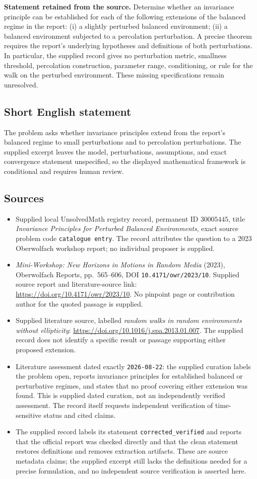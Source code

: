 \documentclass[11pt]{article}
\begin{document}
\textbf{Statement retained from the source.} Determine whether an invariance principle can be established for each of the following extensions of the balanced regime in the report: (i) a slightly perturbed balanced environment; (ii) a balanced environment subjected to a percolation perturbation. A precise theorem requires the report's underlying hypotheses and definitions of both perturbations. In particular, the supplied record gives no perturbation metric, smallness threshold, percolation construction, parameter range, conditioning, or rule for the walk on the perturbed environment. These missing specifications remain unresolved.
\subsection{Short English statement}
The problem asks whether invariance principles extend from the report's balanced regime to small perturbations and to percolation perturbations. The supplied excerpt leaves the model, perturbations, assumptions, and exact convergence statement unspecified, so the displayed mathematical framework is conditional and requires human review.
\subsection{Sources}
\begin{itemize}
\item Supplied local UnsolvedMath registry record, permanent ID \(30005445\), title \emph{Invariance Principles for Perturbed Balanced Environments}, exact source problem code \texttt{catalogue entry}. The record attributes the question to a 2023 Oberwolfach workshop report; no individual proposer is supplied.
\item \emph{Mini-Workshop: New Horizons in Motions in Random Media} (2023), Oberwolfach Reports, pp.\ 565--606, DOI \texttt{10.4171/owr/2023/10}. Supplied source report and literature-source link: \url{https://doi.org/10.4171/owr/2023/10}. No pinpoint page or contribution author for the quoted passage is supplied.
\item Supplied literature source, labelled \emph{random walks in random environments without ellipticity}: \url{https://doi.org/10.1016/j.spa.2013.01.007}. The supplied record does not identify a specific result or passage supporting either proposed extension.
\item Literature assessment dated exactly \texttt{2026-08-22}: the supplied curation labels the problem open, reports invariance principles for established balanced or perturbative regimes, and states that no proof covering either extension was found. This is supplied dated curation, not an independently verified assessment. The record itself requests independent verification of time-sensitive status and cited claims.
\item The supplied record labels its statement \texttt{corrected\_verified} and reports that the official report was checked directly and that the clean statement restores definitions and removes extraction artifacts. These are source metadata claims; the supplied excerpt still lacks the definitions needed for a precise formulation, and no independent source verification is asserted here.
\end{itemize}
\end{document}
